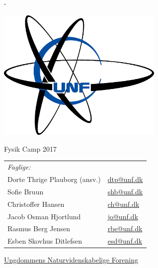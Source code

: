 \begin{titlingpage}
  \newlength{\frontpagecorrection}
  \calccentering{\frontpagecorrection}

  \begin{adjustwidth*}{\frontpagecorrection-2cm}{-\frontpagecorrection-2cm}
    
  \centering

  \vfill

  \includegraphics[width=8cm]{old/Unflogo.eps}
 
  \scshape
    
  \fontsize{24pt}{28pt}\selectfont

  \bigskip

  \vspace{0.5cm}
    
  Fysik Camp 2017\par

  \vspace{1cm}
  
  \begin{table}[h!]
    \centering
    \begin{tabular}{ll}
      \textit{Faglige:} & \\
      Dorte Thrige Plauborg (ansv.)       & \href{mailto:dtp@unf.dk}{dtp@unf.dk} \\
      Sofie Bruun         & \href{mailto:shbl@unf.dk}{shb@unf.dk} \\
      Christoffer Hansen           & \href{mailto:ch@unf.dk}{ch@unf.dk} \\
      Jacob Osman Hjortlund           & \href{mailto:jo@unf.dk}{jo@unf.dk} \\
      Rasmus Berg Jensen           & \href{mailto:rbe@unf.dk}{rbe@unf.dk} \\
       Esben Skovhus Ditlefsen           & \href{mailto:esd@unf.dk}{esd@unf.dk} \\
   
    \end{tabular}
  \end{table}

  \vfill
    
  \fontsize{14pt}{18pt}\selectfont
  \href{http://www.unf.dk/}{Ungdommens Naturvidenskabelige
    Forening}\par
  \end{adjustwidth*}
\end{titlingpage}


